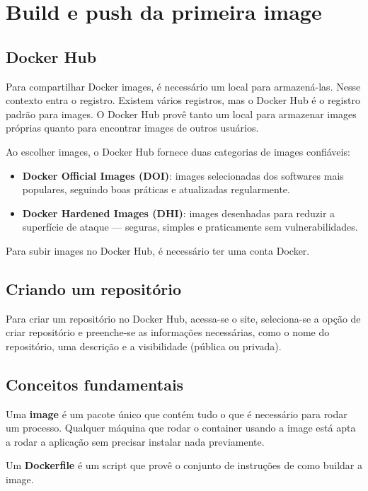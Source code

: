 \section{Build e push da primeira image}

\subsection{Docker Hub}

Para compartilhar Docker images, é necessário um local para armazená-las. Nesse contexto entra o registro. Existem vários registros, mas o Docker Hub é o registro padrão para images. O Docker Hub provê tanto um local para armazenar images próprias quanto para encontrar images de outros usuários.

Ao escolher images, o Docker Hub fornece duas categorias de images confiáveis:

\begin{itemize}
    \item \textbf{Docker Official Images (DOI)}: images selecionadas dos softwares mais populares, seguindo boas práticas e atualizadas regularmente.
    \item \textbf{Docker Hardened Images (DHI)}: images desenhadas para reduzir a superfície de ataque --- seguras, simples e praticamente sem vulnerabilidades.
\end{itemize}

Para subir images no Docker Hub, é necessário ter uma conta Docker.

\subsection{Criando um repositório}

Para criar um repositório no Docker Hub, acessa-se o site, seleciona-se a opção de criar repositório e preenche-se as informações necessárias, como o nome do repositório, uma descrição e a visibilidade (pública ou privada).

\subsection{Conceitos fundamentais}

Uma \textbf{image} é um pacote único que contém tudo o que é necessário para rodar um processo. Qualquer máquina que rodar o container usando a image está apta a rodar a aplicação sem precisar instalar nada previamente.

Um \textbf{Dockerfile} é um script que provê o conjunto de instruções de como buildar a image.


